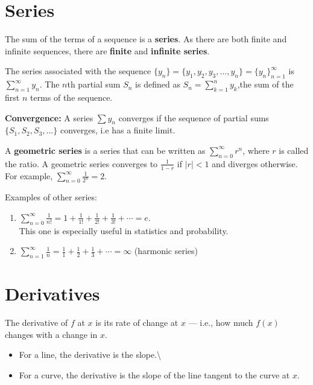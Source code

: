 \documentclass[]{book}
\providecommand{\tightlist}{%
  \setlength{\itemsep}{0pt}\setlength{\parskip}{0pt}}
\theoremstyle{definition}
\theoremstyle{definition}
\theoremstyle{definition}
\theoremstyle{remark}
\begin{document}
\section{Series}\label{series}

The sum of the terms of a sequence is a \textbf{series}. As there are
both finite and infinite sequences, there are \textbf{finite} and
\textbf{infinite series}.

The series associated with the sequence
\(\{y_n\}=\{y_1, y_2, y_3, \ldots, y_n\} = \{y_n\}_{n=1}^{\infty}\) is
\(\sum_{n=1}^{\infty} y_n\). The \(n\)th partial sum \(S_n\) is defined
as \(S_n=\sum_{k=1}^n y_k\),the sum of the first \(n\) terms of the
sequence.

\textbf{Convergence:} A series \(\sum y_n\) converges if the sequence of
partial sums \(\{S_1, S_2, S_3, ...\}\) converges, i.e has a finite
limit.

A \textbf{geometric series} is a series that can be written as
\(\sum_{n=0}^{\infty} r^n\), where \(r\) is called the ratio. A
geometric series converges to \(\frac{1}{1-r}\) if \(|r|< 1\) and
diverges otherwise. For example,
\(\sum_{n=0}^{\infty} \frac{1}{2^n} = 2\).

Examples of other series:

\begin{enumerate}
        \item  $\sum_{n=0}^{\infty} \frac{1}{n!} = 1 + \frac{1}{1!} + \frac{1}{2!} + \frac{1}{3!} + \cdots = e$.\\
        This one is especially useful in statistics and probability.
        \item $\sum_{n=1}^{\infty} \frac{1}{n} = \frac{1}{1} + \frac{1}{2}  + \frac{1}{3} + \cdots = \infty$ (harmonic series)
\end{enumerate}

\section{Derivatives}\label{derivatives}

The derivative of \(f\) at \(x\) is its rate of change at \(x\) ---
i.e., how much \(f(x)\) changes with a change in \(x\).

\begin{itemize}
\tightlist
\item
  For a line, the derivative is the slope.\textbackslash{}
\item
  For a curve, the derivative is the slope of the line tangent to the
  curve at \(x\).
\end{itemize}
\end{document}
